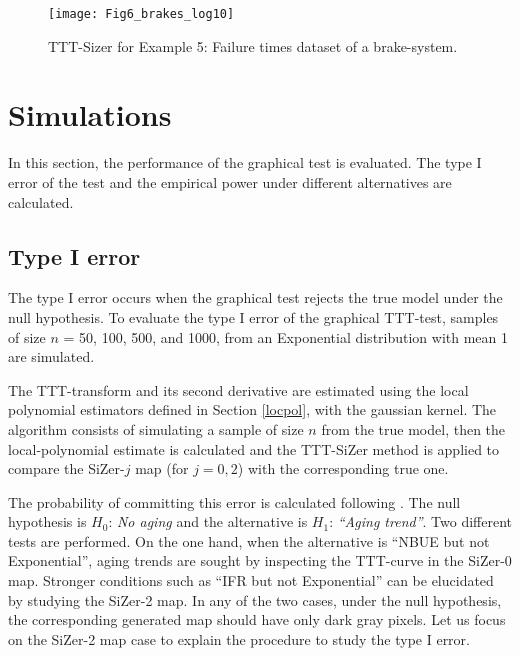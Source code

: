 \documentclass[preprint,12pt]{elsarticle}
\begin{document}
\begin{figure}[htb]
\begin{center}
\texttt{[image: Fig6\_brakes\_log10]}%
\caption{TTT-Sizer for Example 5: Failure times dataset of a brake-system.}\label{Fig:brakes}
\end{center}
\end{figure}
%

\section{Simulations}\label{sec:sim}
In this section, the performance of the graphical test is evaluated. The type I error of the test and the empirical power under different alternatives are calculated.%

\subsection{Type I error}
The type I error occurs when the graphical test rejects the true model under the null hypothesis. To evaluate the type I error of the graphical TTT-test, samples of size $n$ = 50, 100, 500, and 1000, from an Exponential distribution with mean 1 are simulated.

The TTT-transform and its second derivative are estimated using the local polynomial estimators defined in Section \ref{locpol}, with the gaussian kernel.  
The algorithm consists of simulating a sample of size $n$ from the true model, then the local-polynomial estimate is calculated and the TTT-SiZer method is applied to compare the SiZer-$j$ map (for $j=0,2$) with the corresponding true one.

The probability of committing this error is calculated following \cite{RMP07}. The null hypothesis is $H_0$: \textit{No aging} and the  alternative is  $H_1$: \textit{``Aging trend''}. Two different tests are performed. On the one hand, when the alternative is ``NBUE but not Exponential'', aging trends are sought by inspecting the TTT-curve in the SiZer-0 map. 
Stronger conditions such as ``IFR but not Exponential'' can be elucidated by studying the SiZer-2 map. In any of the two cases, under the null hypothesis, the corresponding generated map should have only dark gray pixels.  Let us focus on the SiZer-2 map case to explain the procedure to study the type I error.\\
 
\end{document}
